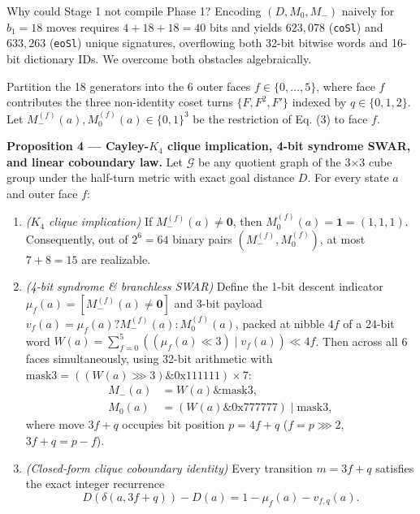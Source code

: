 \documentclass[10pt,twocolumn,letterpaper]{article}
\providecommand{\tightlist}{\setlength{\itemsep}{0pt}\setlength{\parskip}{0pt}}
\begin{document}
Why could Stage 1 not compile Phase 1? Encoding \((D, M_0, M_-)\)
naively for \(b_1=18\) moves requires \(4+18+18=40\) bits and yields
\(623,078\) (\texttt{coSl}) and \(633,263\) (\texttt{eoSl}) unique
signatures, overflowing both 32-bit bitwise words and 16-bit dictionary
IDs. We overcome both obstacles algebraically.

Partition the 18 generators into the 6 outer faces
\(f \in \{0,\dots,5\}\), where face \(f\) contributes the three
non-identity coset turns \(\{F, F^2, F'\}\) indexed by
\(q \in \{0,1,2\}\). Let \(M_-^{(f)}(a), M_0^{(f)}(a) \in \{0,1\}^3\) be
the restriction of Eq. (3) to face \(f\).

\textbf{Proposition 4 --- Cayley-\(K_4\) clique implication, 4-bit
syndrome SWAR, and linear coboundary law.} Let \(\mathcal G\) be any
quotient graph of the 3×3 cube group under the half-turn metric with
exact goal distance \(D\). For every state \(a\) and outer face \(f\):

\begin{enumerate}
\def\labelenumi{\arabic{enumi}.}
\tightlist
\item
  \emph{(\(K_4\) clique implication)} If
  \(M_-^{(f)}(a) \ne \mathbf{0}\), then
  \(M_0^{(f)}(a) = \mathbf{1} = (1,1,1)\). Consequently, out of
  \(2^6=64\) binary pairs \((M_-^{(f)}, M_0^{(f)})\), at most
  \(7 + 8 = 15\) are realizable.
\item
  \emph{(4-bit syndrome \& branchless SWAR)} Define the 1-bit descent
  indicator \(\mu_f(a) = [M_-^{(f)}(a) \ne \mathbf{0}]\) and 3-bit
  payload \(v_f(a) = \mu_f(a) ? M_-^{(f)}(a) : M_0^{(f)}(a)\), packed at
  nibble \(4f\) of a 24-bit word
  \(W(a) = \sum_{f=0}^{5} ((\mu_f(a)\ll 3)\mathbin{|}v_f(a)) \ll 4f\).
  Then across all 6 faces simultaneously, using 32-bit arithmetic with
  \(\text{mask3} = ((W(a)\ggg 3)\mathbin{\&}\text{0x111111})\times 7\):
  \[
  \begin{aligned}
  M_-(a) &= W(a)\mathbin{\&}\text{mask3},\\
  M_0(a) &= (W(a)\mathbin{\&}\text{0x777777})\mathbin{|}\text{mask3},
  \end{aligned}
  \tag{6}
  \] where move \(3f+q\) occupies bit position \(p=4f+q\)
  (\(f = p\ggg 2\), \(3f+q = p - f\)).
\item
  \emph{(Closed-form clique coboundary identity)} Every transition
  \(m = 3f + q\) satisfies the exact integer recurrence \[
  D(\delta(a, 3f+q)) - D(a) = 1 - \mu_f(a) - v_{f,q}(a).
  \tag{7}
  \]
\end{enumerate}
\end{document}

